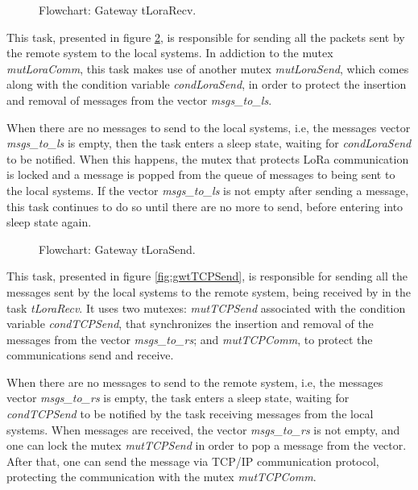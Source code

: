 \begin{figure}[H]
	\centering
	\caption{Flowchart: Gateway tLoraRecv.}
	\label{fig:gwtLoraRecv}
\end{figure}

This task, presented in figure \ref{fig:gwtLoraSend}, is responsible for sending all the packets sent by the remote system to the local systems. In addiction to the mutex \textit{mutLoraComm}, this task makes use of another mutex \textit{mutLoraSend}, which comes along with the condition variable \textit{condLoraSend}, in order to protect the insertion and removal of messages from the vector \textit{msgs\_to\_ls}.

When there are no messages to send to the local systems, i.e, the messages vector \textit{msgs\_to\_ls} is empty, then the task enters a sleep state, waiting for \textit{condLoraSend} to be notified. When this happens, the mutex that protects LoRa communication is locked and a message is popped from the queue of messages to being sent to the local systems. If the vector \textit{msgs\_to\_ls} is not empty after sending a message, this task continues to do so until there are no more to send, before entering into sleep state again.

\begin{figure}[H]
	\centering
	\caption{Flowchart: Gateway tLoraSend.}
	\label{fig:gwtLoraSend}
\end{figure}

This task, presented in figure \ref{fig:gwtTCPSend}, is responsible for sending all the messages sent by the local systems to the remote system, being received by in the task \textit{tLoraRecv}. It uses two mutexes: \textit{mutTCPSend} associated with the condition variable \textit{condTCPSend}, that synchronizes the insertion and removal of the messages from the vector \textit{msgs\_to\_rs}; and \textit{mutTCPComm}, to protect the communications send and receive.

When there are no messages to send to the remote system, i.e, the messages vector \textit{msgs\_to\_rs} is empty, the task enters a sleep state, waiting for \textit{condTCPSend} to be notified by the task receiving messages from the local systems. When messages are received, the vector \textit{msgs\_to\_rs} is not empty, and one can lock the mutex \textit{mutTCPSend} in order to pop a message from the vector. After that, one can send the message via TCP/IP communication protocol, protecting the communication with the mutex \textit{mutTCPComm}.

